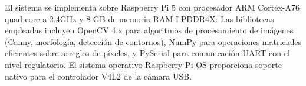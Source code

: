 El sistema se implementa sobre Raspberry Pi 5 con procesador ARM Cortex-A76 quad-core a 2.4GHz y 8 GB de memoria RAM LPDDR4X. Las bibliotecas empleadas incluyen OpenCV 4.x para algoritmos de procesamiento de imágenes (Canny, morfología, detección de contornos), NumPy para operaciones matriciales eficientes sobre arreglos de píxeles, y PySerial para comunicación UART con el nivel regulatorio. El sistema operativo Raspberry Pi OS proporciona soporte nativo para el controlador V4L2 de la cámara USB.